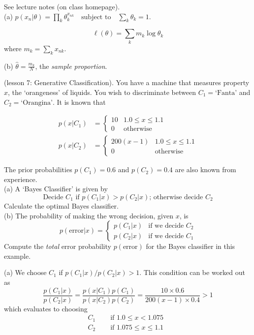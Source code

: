 \documentclass[a4paper]{article}
\begin{document}
\begin{ExerciseList}
\Answer[ref={ex:ML-Mult}]

See lecture notes (on class homepage). \\

(a) $p(x_n|\theta) = \prod_k \theta_k^{x_{nk}} \quad \text{subject to} \quad \sum_k \theta_k = 1$.

$$\ell(\theta)  = \sum_k m_k \log \theta_k$$
where $m_k = \sum_k x_{nk}$.


(b) $\hat \theta = \frac{m_k}{N}$, the \emph{sample proportion}.



\Exercise[label={ex:orangeness}] (lesson 7: Generative Classification). You have a machine that measures property $x$, the `orangeness' of liquids. You wish
to discriminate between $C_1 = \text{`Fanta'}$ and $C_2 = \text{`Orangina'}$. It is known that

\begin{align*}
p(x|C_1) &= \begin{cases} 10 & 1.0 \leq x \leq 1.1\\
    0 & \text{otherwise}
    \end{cases}\\
p(x|C_2) &= \begin{cases} 200(x - 1) & 1.0 \leq x \leq 1.1\\
0 & \text{otherwise}
\end{cases}
\end{align*}

The prior probabilities $p(C_1) = 0.6$ and $p(C_2) = 0.4$ are also known from experience.\\
(a) A `Bayes Classifier' is given by
$$ \text{Decide $C_1$ if $p(C_1|x)>p(C_2|x)$; otherwise decide $C_2$}$$
Calculate the optimal Bayes classifier.\\
(b) The probability of making the wrong decision, given $x$, is
\begin{equation}
p(\text{error}|x)= \begin{cases} p(C_1|x) & \text{if we decide $C_2$}\\
    p(C_2|x) & \text{if we decide $C_1$}
\end{cases}
\label{eq:p(error|x)}
\end{equation}
Compute the \emph{total} error probability  $p(\text{error})$ for the Bayes classifier in this example.

\Answer[ref={ex:orangeness}]
(a) We choose $C_1$ if $p(C_1|x)/p(C_2|x) > 1$. This condition can be worked out as
$$
\frac{p(C_1|x)}{p(C_2|x)} = \frac{p(x|C_1)p(C_1)}{p(x|C_2)p(C_2)} = \frac{10 \times 0.6}{200(x-1)\times 0.4}>1
$$
which evaluates to choosing
\begin{align*}
C_1 &\quad \text{ if $1.0\leq x < 1.075$}\\ C_2 &\quad \text{ if $1.075 \leq x \leq 1.1$ }
\end{align*}


\end{ExerciseList}
\end{document}
